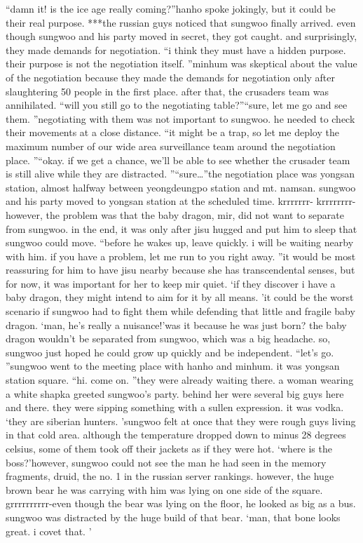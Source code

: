 “damn it! is the ice age really coming?”hanho spoke jokingly, but it could be their real purpose.
***the russian guys noticed that sungwoo finally arrived.
 even though sungwoo and his party moved in secret, they got caught.
 and surprisingly, they made demands for negotiation.
“i think they must have a hidden purpose.
 their purpose is not the negotiation itself.
”minhum was skeptical about the value of the negotiation because they made the demands for negotiation only after slaughtering 50 people in the first place.
 after that, the crusaders team was annihilated.
“will you still go to the negotiating table?”“sure, let me go and see them.
”negotiating with them was not important to sungwoo.
 he needed to check their movements at a close distance.
“it might be a trap, so let me deploy the maximum number of our wide area surveillance team around the negotiation place.
”“okay.
 if we get a chance, we’ll be able to see whether the crusader team is still alive while they are distracted.
”“sure…”the negotiation place was yongsan station, almost halfway between yeongdeungpo station and mt.
 namsan.
 sungwoo and his party moved to yongsan station at the scheduled time.
krrrrrrr- krrrrrrrr-however, the problem was that the baby dragon, mir, did not want to separate from sungwoo.
 in the end, it was only after jisu hugged and put him to sleep that sungwoo could move.
“before he wakes up, leave quickly.
 i will be waiting nearby with him.
 if you have a problem, let me run to you right away.
”it would be most reassuring for him to have jisu nearby because she has transcendental senses, but for now, it was important for her to keep mir quiet.
‘if they discover i have a baby dragon, they might intend to aim for it by all means.
’it could be the worst scenario if sungwoo had to fight them while defending that little and fragile baby dragon.
‘man, he’s really a nuisance!’was it because he was just born? the baby dragon wouldn’t be separated from sungwoo, which was a big headache.
 so, sungwoo just hoped he could grow up quickly and be independent.
“let’s go.
”sungwoo went to the meeting place with hanho and minhum.
 it was yongsan station square.
“hi.
 come on.
”they were already waiting there.
 a woman wearing a white shapka greeted sungwoo’s party.
behind her were several big guys here and there.
 they were sipping something with a sullen expression.
 it was vodka.
‘they are siberian hunters.
’sungwoo felt at once that they were rough guys living in that cold area.
 although the temperature dropped down to minus 28 degrees celsius, some of them took off their jackets as if they were hot.
‘where is the boss?’however, sungwoo could not see the man he had seen in the memory fragments, druid, the no.
 1 in the russian server rankings.
 however, the huge brown bear he was carrying with him was lying on one side of the square.
grrrrrrrrrr-even though the bear was lying on the floor, he looked as big as a bus.
sungwoo was distracted by the huge build of that bear.
‘man, that bone looks great.
 i covet that.
’

